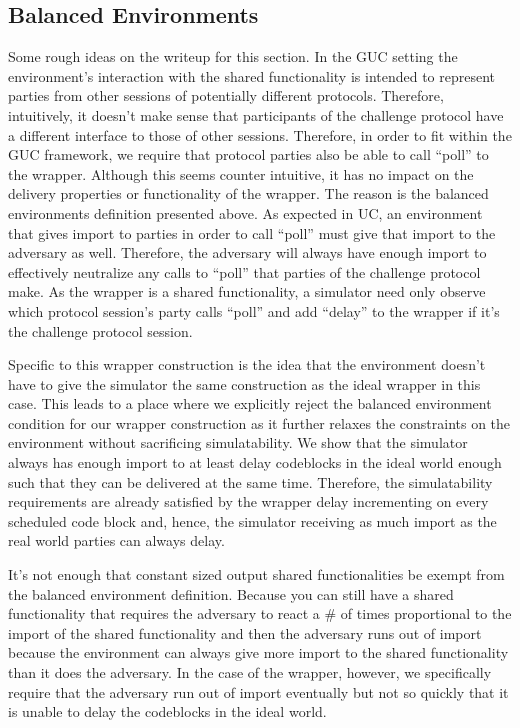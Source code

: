 \subsection{Balanced Environments}
Some rough ideas on the writeup for this section.
In the GUC setting the environment’s interaction with the shared functionality is intended to represent parties from other sessions of potentially different protocols. 
Therefore, intuitively, it doesn’t make sense that participants of the challenge protocol have a different interface to those of other sessions. 
Therefore, in order to fit within the GUC framework, we require that protocol parties also be able to call “poll” to the wrapper. 
Although this seems counter intuitive, it has no impact on the delivery properties or functionality of the wrapper. 
The reason is the balanced environments definition presented above. 
As expected in UC, an environment that gives import to parties in order to call “poll” must give that import to the adversary as well. 
Therefore, the adversary will always have enough import to effectively neutralize any calls to “poll” that parties of the challenge protocol make. 
As the wrapper is a shared functionality, a simulator need only observe which protocol session’s party calls “poll” and add “delay” to the wrapper if it’s the challenge protocol session.  

Specific to this wrapper construction is the idea that the environment doesn’t have to give the simulator the same construction as the ideal wrapper in this case. 
This leads to a place where we explicitly reject the balanced environment condition for our wrapper construction as it further relaxes the constraints on the environment without sacrificing simulatability. 
We show that the simulator always has enough import to at least delay codeblocks in the ideal world enough such that they can be delivered at the same time. 
Therefore, the simulatability requirements are already satisfied by the wrapper delay incrementing on every scheduled code block and, hence, the simulator receiving as much import as the real world parties can always delay.

It’s not enough that constant sized output shared functionalities be exempt from the balanced environment definition. Because you can still have a shared functionality that requires the adversary to react a \# of times proportional to the import of the shared functionality and then the adversary runs out of import because the environment can always give more import to the shared functionality than it does the adversary.
In the case of the wrapper, however, we specifically require that the adversary run out of import eventually but not so quickly that it is unable to delay the codeblocks in the ideal world.



